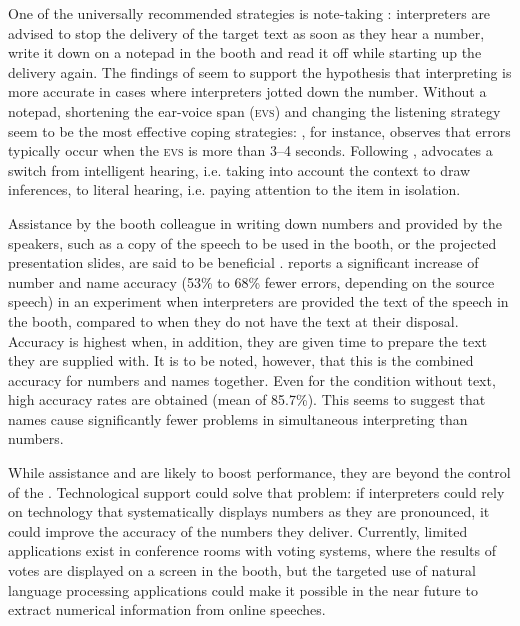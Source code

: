 \documentclass[output=paper]{langsci/langscibook}
\begin{document}
One of the universally recommended strategies is note-taking \citep{Setton1999,Jones2002,Mead2015}: interpreters are advised to stop the delivery of the target text as soon as they hear a number, write it down on a notepad in the booth and read it off while starting up the delivery again. The findings of \citet{Mazza2001} seem to support the hypothesis that interpreting is more accurate in cases where interpreters jotted down the number. Without a notepad, shortening the ear-voice span (\textsc{evs}) and changing the listening strategy seem to be the most effective coping strategies: \citet{Setton1999}, for instance, observes that errors typically occur when the \textsc{evs} is more than 3--4 seconds. Following \citet{Seleskovitch1975}, \citet{Pinochi2009} advocates a switch from intelligent hearing, i.e. taking into account the context to draw inferences, to literal hearing, i.e. paying attention to the item in isolation.

Assistance by the booth colleague in writing down numbers and  provided by the speakers, such as a copy of the speech to be used in the booth, or the projected presentation slides, are said to be beneficial \citep{Mead2015}. \citet{Lamberger-Felber2001} reports a significant increase of number and name accuracy (53\% to 68\% fewer errors, depending on the source speech) in an experiment when interpreters are provided the text of the speech in the booth, compared to when they do not have the text at their disposal. Accuracy is highest when, in addition, they are given time to prepare the text they are supplied with. It is to be noted, however, that this is the combined accuracy for numbers and names together. Even for the condition without text, high accuracy rates are obtained (mean of 85.7\%). This seems to suggest that names cause significantly fewer problems in simultaneous interpreting than numbers.\largerpage[-1]

While assistance and  are likely to boost performance, they are beyond the control of the . Technological support could solve that problem: if interpreters could rely on technology that systematically displays numbers as they are pronounced, it could improve the accuracy of the numbers they deliver. Currently, limited applications exist in conference rooms with voting systems, where the results of votes are displayed on a screen in the booth, but the targeted use of natural language processing applications could make it possible in the near future to extract numerical information from online speeches. 
\end{document}

